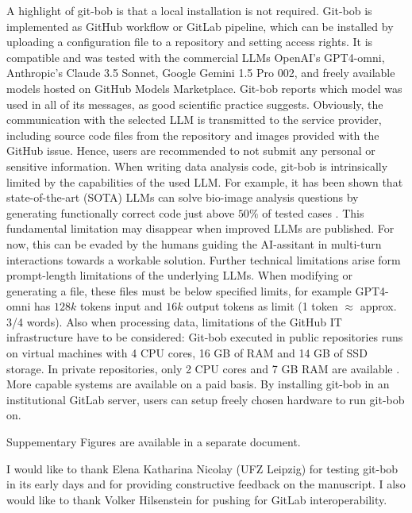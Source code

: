 \documentclass[sn-mathphys-num]{sn-jnl}%
\theoremstyle{thmstyleone}%
\theoremstyle{thmstyletwo}%
\theoremstyle{thmstylethree}%
\begin{document}
A highlight of git-bob is that a local installation is not required. Git-bob is implemented as GitHub workflow or GitLab pipeline, which can be installed by uploading a configuration file to a repository and setting access rights. It is compatible and was tested with the commercial LLMs OpenAI's GPT4-omni, Anthropic's Claude 3.5 Sonnet, Google Gemini 1.5 Pro 002, and freely available models hosted on GitHub Models Marketplace. Git-bob reports which model was used in all of its messages, as good scientific practice suggests. Obviously, the communication with the selected LLM is transmitted to the service provider, including source code files from the repository and images provided with the GitHub issue. Hence, users are recommended to not submit any personal or sensitive information. When writing data analysis code, git-bob is intrinsically limited by the capabilities of the used LLM. For example, it has been shown that state-of-the-art (SOTA) LLMs can solve bio-image analysis questions by generating functionally correct code just above $50\%$ of tested cases \cite{benchmark_llm_bia}. This fundamental limitation may disappear when improved LLMs are published. For now, this can be evaded by the humans guiding the AI-assitant in multi-turn interactions towards a workable solution. Further technical limitations arise form prompt-length limitations of the underlying LLMs. When modifying or generating a file, these files must be below specified limits, for example GPT4-omni has $128k$ tokens input and $16k$ output tokens as limit (1 token $\approx$ approx. 3/4 words). Also when processing data, limitations of the GitHub IT infrastructure have to be considered: Git-bob executed in public repositories runs on virtual machines with 4 CPU cores, 16 GB of RAM and 14 GB of SSD storage. In private repositories, only 2 CPU cores and 7 GB RAM are available \cite{github_actions_runners_2024}. More capable systems are available on a paid basis. By installing git-bob in an institutional GitLab server, users can setup freely chosen hardware to run git-bob on.


\backmatter


Suppementary Figures are available in a separate document.


I would like to thank Elena Katharina Nicolay (UFZ Leipzig) for testing git-bob in its early days and for providing constructive feedback on the manuscript. I also would like to thank Volker Hilsenstein for pushing for GitLab interoperability.
\end{document}
